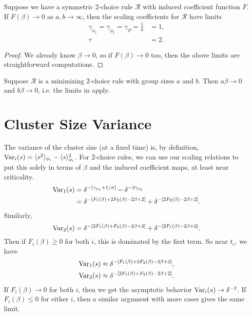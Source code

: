 \documentclass[twoside,10pt]{article}
\begin{document}
\begin{prop}[]
	\label{symm-limits}
	Suppose we have a symmetric 2-choice rule $\mathcal{R}$ with induced coefficient function $F$. If $F(\beta) \to 0$ as $a,b \to \infty$, then the scaling coefficients for $\mathcal{R}$ have limits
	\begin{align*}
		\gamma_{\phi_1} = \gamma_{\phi_2} = \gamma_{P} = \frac{1}{\sigma} &= 1,\\
		\tau &= 2.
	\end{align*}
\end{prop}
\begin{proof}
	We already know $\beta \to 0$, so if $F(\beta)\to 0$ too, then the above limits are straightforward computations.
\end{proof}

\begin{conj}[]
	\label{m-beta-0}
	Suppose $\mathcal{R}$ is a minimizing 2-choice rule with group sizes $a$ and $b$. Then $a\beta \to 0$ and $b\beta\to 0$, i.e. the limits in  apply.
\end{conj}

\section{Cluster Size Variance}

The variance of the cluster size (at a fixed time) is, by definition, $\operatorname{Var}_i(s) = \langle s^2 \rangle_{\phi_i} - \langle s \rangle^2_{\phi_i}$. For 2-choice rules, we can use our scaling relations to put this solely in terms of $\beta$ and the induced coefficient maps, at least near criticality.
\begin{align*}
	\operatorname{Var}_1(s) &= \delta^{-[\gamma_{\phi_1} + 1/\sigma]} - \delta^{-2\gamma_{\phi_1}} \\
		  &= \delta^{-[F_1(\beta)+2F_2(\beta)-2\beta+2]} + \delta^{-[2F_2(\beta)-2\beta+2]}.
\end{align*}
Similarly,
\[
        \operatorname{Var}_2(s) = \delta^{-[2F_1(\beta)+F_2(\beta)-2\beta+2]} + \delta^{-[2F_1(\beta)-2\beta+2]}.
\]
Then if $F_i(\beta) \geq 0$ for both $i$, this is dominated by the first term. So near $t_c$, we have
\begin{align*}
	\operatorname{Var}_1(s) &\approx \delta^{-[F_1(\beta)+2F_2(\beta)-2\beta+2]}, \\
	\operatorname{Var}_2(s) &\approx \delta^{-[2F_1(\beta)+F_2(\beta)-2\beta+2]}.
\end{align*}
If $F_{i}(\beta)\to 0$ for both $i$, then we get the asymptotic behavior $\operatorname{Var}_i(s) \to \delta^{-2}$. If $F_{i}(\beta) \leq 0$ for either $i$, then a similar argument with more cases gives the same limit.
\end{document}
